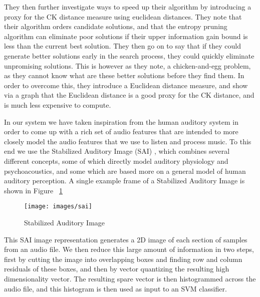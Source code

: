 They then further investigate ways to speed up their algorithm by
introducing a proxy for the CK distance measure using euclidean
distances.  They note that their algorithm orders candidate solutions,
and that the entropy pruning algorithm can eliminate poor solutions if
their upper information gain bound is less than the current best
solution.  They then go on to say that if they could generate better
solutions early in the search process, they could quickly eliminate
unpromising solutions.  This is however as they note, a
chicken-and-egg problem, as they cannot know what are these better
solutions before they find them.  In order to overcome this, they
introduce a Euclidean distance measure, and show via a graph that the
Euclidean distance is a good proxy for the CK distance, and is much
less expensive to compute.




In our system we have taken inspiration from the human auditory system
in order to come up with a rich set of audio features that are
intended to more closely model the audio features that we use to
listen and process music.  To this end we use the Stabilized Auditory
Image (SAI) \cite{lyon1990} \cite{patterson2000}, which combines
several different concepts, some of which directly model auditory
physiology and psychoacoustics, and some which are based more on a
general model of human auditory perception.  A single example frame of
a Stabilized Auditory Image is shown in Figure ~\ref{fig:sai}

\begin{figure}[here]
\texttt{[image: images/sai]}
\caption{Stabilized Auditory Image \label{fig:sai}}
\end{figure}

This SAI image representation generates a 2D image of each section of
samples from an audio file.  We then reduce this large amount of
information in two steps, first by cutting the image into overlapping
boxes and finding row and column residuals of these boxes, and then by
vector quantizing the resulting high dimensionality vector.  The
resulting spare vector is then histogrammed across the audio file, and
this histogram is then used as input to an SVM \cite{yh05} classifier\cite{chapelle2006}.


